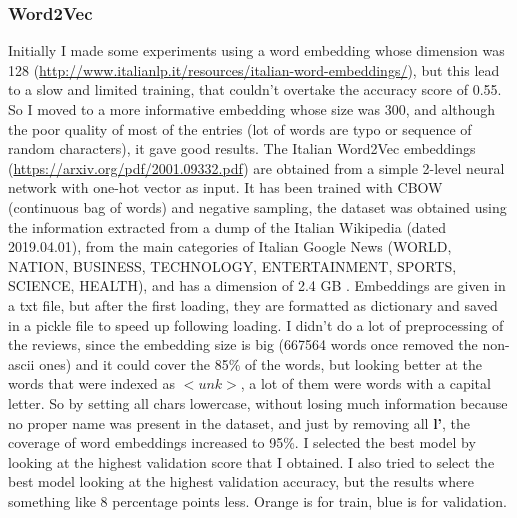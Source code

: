 \documentclass{article}
\begin{document}
            \subsubsection{Word2Vec}
            Initially I made some experiments using a word embedding whose dimension was 128 (\url{http://www.italianlp.it/resources/italian-word-embeddings/}),
            but this lead to a slow and limited training, that couldn't overtake the accuracy score of 0.55.
            So I moved to a more informative embedding whose size was 300, and although the poor quality of most of the entries
            (lot of words are typo or sequence of random characters), it gave good results.
            The Italian Word2Vec embeddings (\url{https://arxiv.org/pdf/2001.09332.pdf}) are obtained from a simple 2-level neural network with one-hot vector as input.
            It has been trained with CBOW (continuous bag of words) and negative sampling, the dataset was obtained using the information extracted from a
            dump of the Italian Wikipedia (dated 2019.04.01), from the main categories of Italian Google News (WORLD, NATION, BUSINESS,
            TECHNOLOGY, ENTERTAINMENT, SPORTS, SCIENCE, HEALTH), and has a dimension of 2.4 GB .
            Embeddings are given in a txt file, but after the first loading, they are formatted as dictionary and saved in a pickle file
            to speed up following loading.
            I didn't do a lot of preprocessing of the reviews, since the embedding size is big (667564 words once removed the non-ascii ones)
            and it could cover the 85\% of the words, but looking better at the words that were indexed as $<unk>$, a lot of them were words with a capital letter.
            So by setting all chars lowercase, without losing much information because no proper name was present in the dataset, and just by removing all \textbf{l'},
            the coverage of word embeddings increased to 95\%.
            I selected the best model by looking at the highest validation score that I obtained.
            I also tried to select the best model looking at the highest validation accuracy, but the results where something like 8 percentage points less.
            \color{orange} Orange is for train, \color{blue} blue is for validation.\color{black}
\end{document}
